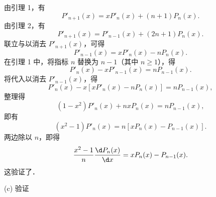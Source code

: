 \begin{myproof}
    由引理 1，有
    \begin{equation}\label{eq:proof-b-1}
        P'_{n+1}(x) = x P'_n(x) + (n+1) P_n(x).
    \end{equation}
    由引理 2，有
    \begin{equation}\label{eq:proof-b-2}
        P'_{n+1}(x) = P'_{n-1}(x) + (2n+1) P_n(x).
    \end{equation}
    联立与以消去 $P'_{n+1}(x)$，可得
    \begin{equation}\label{eq:proof-b-3}
        P'_{n-1}(x) = x P'_n(x) - n P_n(x).
    \end{equation}
    在引理 1 中，将指标 $n$ 替换为 $n-1$（其中 $n \geqslant 1$），得
    \begin{equation}\label{eq:proof-b-4}
        P'_n(x) - x P'_{n-1}(x) = n P_{n-1}(x).
    \end{equation}
    将代入以消去 $P'_{n-1}(x)$，得
    \begin{equation}\label{eq:proof-b-5}
        P'_n(x) - x \left[ x P'_n(x) - n P_n(x) \right] = n P_{n-1}(x),
    \end{equation}
    整理得
    \begin{equation}\label{eq:proof-b-6}
        (1 - x^2) P'_n(x) + n x P_n(x) = n P_{n-1}(x),
    \end{equation}
    即有
    \begin{equation}\label{eq:proof-b-7}
        (x^2 - 1) P'_n(x) = n \left[ x P_n(x) - P_{n-1}(x) \right].
    \end{equation}
    两边除以 $n$，即得
    \begin{equation}\label{eq:proof-b-final}
        \frac{x^2 - 1}{n} \frac{\d P_n(x)}{\d x} = x P_n(x) - P_{n-1}(x).
    \end{equation}
    这验证了．

    (c) 验证


\end{myproof}
